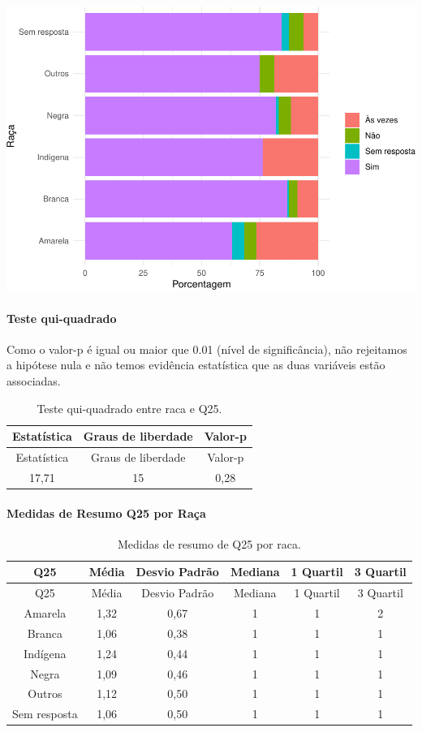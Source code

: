 \documentclass[]{article}
\let\oldparagraph\paragraph
\renewcommand{\paragraph}[1]{\oldparagraph{#1}\mbox{}}
\begin{document}
\begin{center}\includegraphics[width=0.75\linewidth]{relatorio_covid19_files/figure-latex/unnamed-chunk-692-1} \end{center}

\hypertarget{teste-qui-quadrado-60}{%
\paragraph{Teste qui-quadrado}\label{teste-qui-quadrado-60}}

Como o valor-p é igual ou maior que 0.01 (nível de significância), não rejeitamos a hipótese nula e não temos evidência estatística que as duas variáveis estão associadas.

\begin{longtable}[]{@{}ccc@{}}
\caption{\label{tab:unnamed-chunk-694}Teste qui-quadrado entre raca e Q25.}\tabularnewline
\toprule
Estatística & Graus de liberdade & Valor-p\tabularnewline
\midrule
\endfirsthead
\toprule
Estatística & Graus de liberdade & Valor-p\tabularnewline
\midrule
\endhead
17,71 & 15 & 0,28\tabularnewline
\bottomrule
\end{longtable}

\cleardoublepage

\hypertarget{medidas-de-resumo-q25-por-rauxe7a}{%
\paragraph{Medidas de Resumo Q25 por Raça}\label{medidas-de-resumo-q25-por-rauxe7a}}

\begin{longtable}[]{@{}cccccc@{}}
\caption{\label{tab:unnamed-chunk-695}Medidas de resumo de Q25 por raca.}\tabularnewline
\toprule
Q25 & Média & Desvio Padrão & Mediana & 1 Quartil & 3 Quartil\tabularnewline
\midrule
\endfirsthead
\toprule
Q25 & Média & Desvio Padrão & Mediana & 1 Quartil & 3 Quartil\tabularnewline
\midrule
\endhead
Amarela & 1,32 & 0,67 & 1 & 1 & 2\tabularnewline
Branca & 1,06 & 0,38 & 1 & 1 & 1\tabularnewline
Indígena & 1,24 & 0,44 & 1 & 1 & 1\tabularnewline
Negra & 1,09 & 0,46 & 1 & 1 & 1\tabularnewline
Outros & 1,12 & 0,50 & 1 & 1 & 1\tabularnewline
Sem resposta & 1,06 & 0,50 & 1 & 1 & 1\tabularnewline
\bottomrule
\end{longtable}
\end{document}
